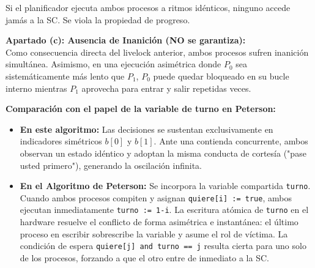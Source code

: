 \documentclass[11pt,a4paper,twoside,openright]{report}
\begin{document}
\begin{solucion}
\begin{center}
\end{center}
Si el planificador ejecuta ambos procesos a ritmos idénticos, ninguno accede jamás a la SC. Se viola la propiedad de progreso.

\textbf{Apartado (c): Ausencia de Inanición (NO se garantiza):}\\
Como consecuencia directa del livelock anterior, ambos procesos sufren inanición simultánea. Asimismo, en una ejecución asimétrica donde $P_0$ sea sistemáticamente más lento que $P_1$, $P_0$ puede quedar bloqueado en su bucle interno mientras $P_1$ aprovecha para entrar y salir repetidas veces.

\textbf{Comparación con el papel de la variable de turno en Peterson:}\\
\begin{itemize}[leftmargin=*]
    \item \textbf{En este algoritmo:} Las decisiones se sustentan exclusivamente en indicadores simétricos $b[0]$ y $b[1]$. Ante una contienda concurrente, ambos observan un estado idéntico y adoptan la misma conducta de cortesía ("pase usted primero"), generando la oscilación infinita.
    \item \textbf{En el Algoritmo de Peterson:} Se incorpora la variable compartida \texttt{turno}. Cuando ambos procesos compiten y asignan \texttt{quiere[i] := true}, ambos ejecutan inmediatamente \texttt{turno := 1-i}. La escritura atómica de \texttt{turno} en el hardware resuelve el conflicto de forma asimétrica e instantánea: el último proceso en escribir sobrescribe la variable y asume el rol de víctima. La condición de espera \texttt{quiere[j] and turno == j} resulta cierta para uno solo de los procesos, forzando a que el otro entre de inmediato a la SC.
\end{itemize}
\end{solucion}
\end{document}
